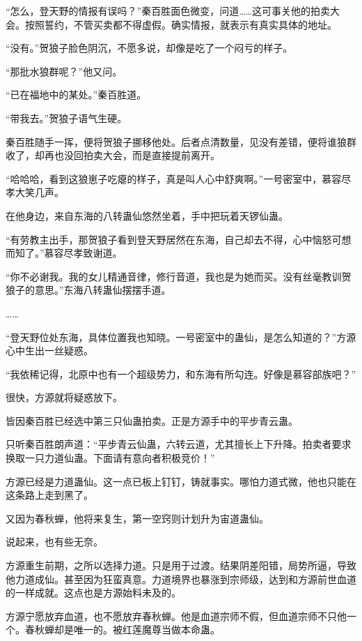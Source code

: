 
\begin{this_body}

“怎么，登天野的情报有误吗？”秦百胜面色微变，问道……这可事关他的拍卖大会。按照誓约，不管买卖都不得虚假。确实情报，就表示有真实具体的地址。

“没有。”贺狼子脸色阴沉，不愿多说，却像是吃了一个闷亏的样子。

“那批水狼群呢？”他又问。

“已在福地中的某处。”秦百胜道。

“带我去。”贺狼子语气生硬。

秦百胜随手一挥，便将贺狼子挪移他处。后者点清数量，见没有差错，便将谁狼群收了，却再也没回拍卖大会，而是直接提前离开。

“哈哈哈，看到这狼崽子吃瘪的样子，真是叫人心中舒爽啊。”一号密室中，慕容尽孝大笑几声。

在他身边，来自东海的八转蛊仙悠然坐着，手中把玩着天锣仙蛊。

“有劳教主出手，那贺狼子看到登天野居然在东海，自己却去不得，心中恼怒可想而知了。”慕容尽孝致谢道。

“你不必谢我。我的女儿精通音律，修行音道，我也是为她而买。没有丝毫教训贺狼子的意思。”东海八转蛊仙摆摆手道。

……

“登天野位处东海，具体位置我也知晓。一号密室中的蛊仙，是怎么知道的？”方源心中生出一丝疑惑。

“我依稀记得，北原中也有一个超级势力，和东海有所勾连。好像是慕容部族吧？”

很快，方源就将疑惑放下。

皆因秦百胜已经选中第三只仙蛊拍卖。正是方源手中的平步青云蛊。

只听秦百胜朗声道：“平步青云仙蛊，六转云道，尤其擅长上下升降。拍卖者要求换取一只力道仙蛊。下面请有意向者积极竞价！”

方源已经是力道蛊仙。这一点已板上钉钉，铸就事实。哪怕力道式微，他也只能在这条路上走到黑了。

又因为春秋蝉，他将来复生，第一空窍则计划升为宙道蛊仙。

说起来，也有些无奈。

方源重生前期，之所以选择力道。只是用于过渡。结果阴差阳错，局势所逼，导致他力道成仙。甚至因为狂蛮真意。力道境界也暴涨到宗师级，达到和方源前世血道的一样成就。这点也是方源始料未及的。

方源宁愿放弃血道，也不愿放弃春秋蝉。他是血道宗师不假，但血道宗师不只他一个。春秋蝉却是唯一的。被红莲魔尊当做本命蛊。


\end{this_body}
